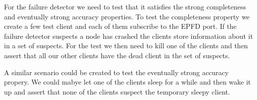 \documentclass[a4paper, 11pt]{article}
\begin{document}
For the failure detector we need to test that it satisfies the strong completeness and eventually strong accuracy properties. To test the completeness property we create a few test client and each of them subscribe to the EPFD port. If the failure detector suspects a node has crashed the clients store information about it in a set of suspects. For the test we then need to kill one of the clients and then assert that all our other clients have the dead client in the set of suspects. 

A similar scenario could be created to test the eventually strong accuracy propery. We could mabye let one of the clients sleep for a while and then wake it up and assert that none of the clients suspect the temporary sleepy client.  
\end{document}
